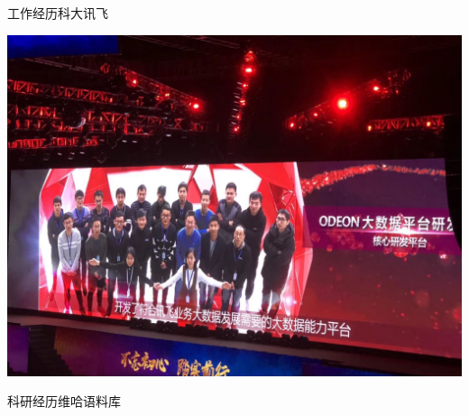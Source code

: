 \documentclass[xcolor=svgnames, t, aspectratio=169]{ctexbeamer}
\begin{document}
\begin{frame}{工作经历}{科大讯飞}
  \begin{center}
    \includegraphics[scale=0.2,trim=0 0 0 300,clip]{iflytek.jpg}
  \end{center}
\end{frame}
\begin{frame}{科研经历}{维哈语料库}
\end{frame}
{\taruwavesbg
\begin{frame}
\end{frame}
}
\end{document}
